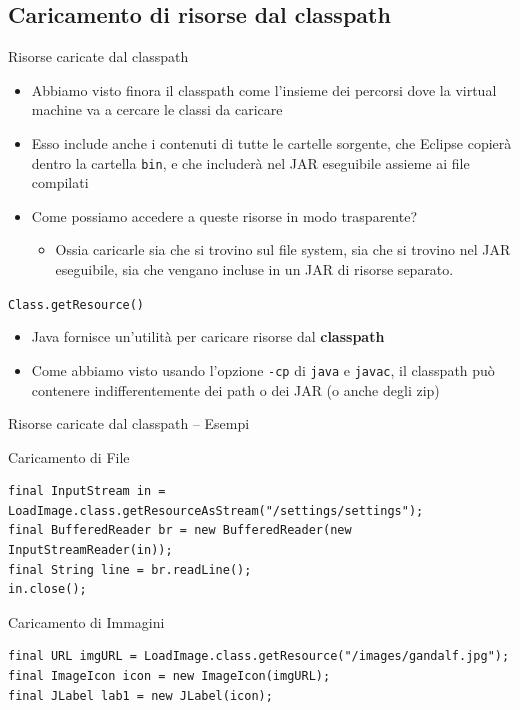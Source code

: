 \documentclass[presentation]{beamer}
\begin{document}
\subsection{Caricamento di risorse dal classpath}

\begin{frame}{Risorse caricate dal classpath}
	\begin{itemize}
		\item Abbiamo visto finora il classpath come l'insieme dei percorsi dove la virtual machine va a cercare le classi da caricare
		\item Esso include anche i contenuti di tutte le cartelle sorgente, che Eclipse copierà dentro la cartella \texttt{bin}, e che includerà nel JAR eseguibile assieme ai file compilati
		\item Come possiamo accedere a queste risorse in modo trasparente?
		\begin{itemize}
			\item Ossia caricarle sia che si trovino sul file system, sia che si trovino nel JAR eseguibile, sia che vengano incluse in un JAR di risorse separato.
		\end{itemize} 
	\end{itemize}
	\begin{block}{\texttt{Class.getResource()}}
		\begin{itemize}
			\item Java fornisce un'utilità per caricare risorse dal \textbf{classpath}
			\item Come abbiamo visto usando l'opzione \texttt{-cp} di \texttt{java} e \texttt{javac}, il classpath può contenere indifferentemente dei path o dei JAR (o anche degli zip)
		\end{itemize}
		\end{block}
\end{frame}

\begin{frame}[fragile]{Risorse caricate dal classpath -- Esempi}

\begin{block}{Caricamento di File}
\begin{lstlisting}
final InputStream in = LoadImage.class.getResourceAsStream("/settings/settings");
final BufferedReader br = new BufferedReader(new InputStreamReader(in));
final String line = br.readLine();
in.close();
\end{lstlisting}
\end{block}

\begin{block}{Caricamento di Immagini}
\begin{lstlisting}
final URL imgURL = LoadImage.class.getResource("/images/gandalf.jpg");
final ImageIcon icon = new ImageIcon(imgURL);
final JLabel lab1 = new JLabel(icon);
\end{lstlisting}
\end{block}
\end{frame}
\end{document}
